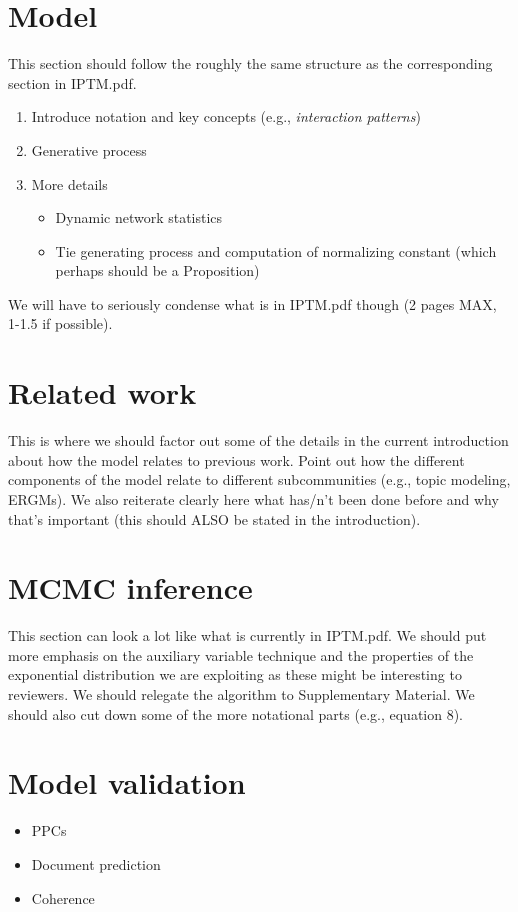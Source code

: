 \documentclass[twoside]{article}
\begin{document}
\section{Model}
This section should follow the roughly the same structure as the corresponding section in IPTM.pdf.
\begin{enumerate}
\item Introduce notation and key concepts (e.g., \emph{interaction patterns}) 
\item Generative process
\item More details
\begin{itemize}
\item Dynamic network statistics
\item Tie generating process and computation of normalizing constant (which perhaps should be a Proposition)
\end{itemize}
\end{enumerate}
We will have to seriously condense what is in IPTM.pdf though (2 pages MAX, 1-1.5 if possible).

\section{Related work}
This is where we should factor out some of the details in the current introduction about how the model relates to previous work.  Point out how the different components of the model relate to different subcommunities (e.g., topic modeling, ERGMs).  We also reiterate clearly here what has/n't been done before and why that's important (this should ALSO be stated in the introduction).   
\section{MCMC inference}
This section can look a lot like what is currently in IPTM.pdf.  We should put more emphasis on the auxiliary variable technique and the properties of the exponential distribution we are exploiting as these might be interesting to reviewers.  We should relegate the algorithm to Supplementary Material.  We should also cut down some of the more notational parts (e.g., equation 8). 

\section{Model validation}
\begin{itemize}
\item PPCs
\item Document prediction
\item Coherence
\end{itemize}
\end{document}
